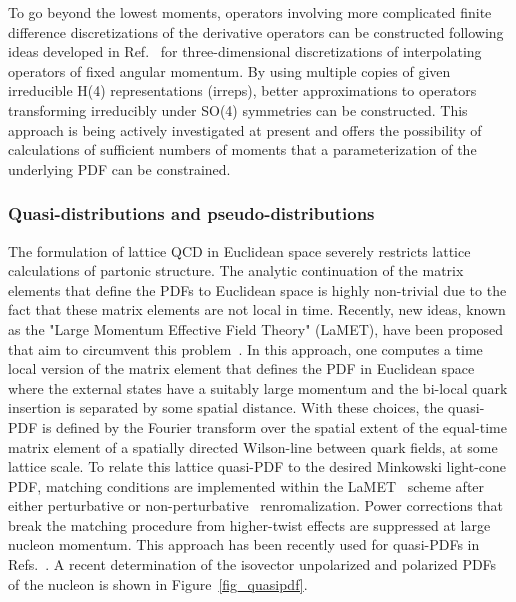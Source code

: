 To go beyond the lowest moments, operators involving more complicated finite difference discretizations of the derivative operators can be constructed following ideas developed in Ref.~\cite{Davoudi:2012ya} for  three-dimensional discretizations of interpolating operators of fixed angular momentum. By using multiple copies of given irreducible H(4) representations (irreps), better approximations to operators transforming irreducibly under SO(4) symmetries can be constructed. This approach is being actively investigated at present \cite{IDavoudiLattice2018} and offers the possibility of calculations of sufficient numbers of moments that a parameterization of the underlying PDF can be constrained.



\subsubsection{Quasi-distributions and pseudo-distributions}



The formulation of lattice QCD in Euclidean space severely restricts
lattice calculations of partonic structure.  
The analytic continuation of the matrix elements that define the PDFs to Euclidean space is highly non-trivial due to the fact that these matrix elements are not local in time. Recently, new ideas,  known as the "Large Momentum Effective Field Theory" (LaMET),  have
been proposed that aim to circumvent this problem~\cite{Ji:2013dva,Ji:2014gla}.
In this approach, one computes a time local version of the matrix element that defines the PDF in Euclidean space
where the external states have a suitably large momentum  and the
bi-local quark insertion is separated by some spatial distance.
%
With these choices, the quasi-PDF is defined by the Fourier transform over the spatial extent of the equal-time matrix element of a spatially directed Wilson-line between quark fields, at some lattice scale. To relate this lattice quasi-PDF to the desired Minkowski light-cone PDF, matching conditions are implemented within the LaMET~\cite{Ji:2013dva,Ji:2014gla} scheme after either perturbative or non-perturbative~\cite{Martinelli:1994ty} renromalization. Power corrections that break the matching  procedure from  higher-twist effects are suppressed at large nucleon momentum. This approach has been recently used  for quasi-PDFs  in Refs.~\cite{Alexandrou:2017huk,Chen:2017mzz,Green:2017xeu,Chen:2018xof,Lin:2018qky}. A recent determination of the isovector unpolarized and polarized PDFs of the  nucleon is shown in Figure~\ref{fig_quasipdf}.

